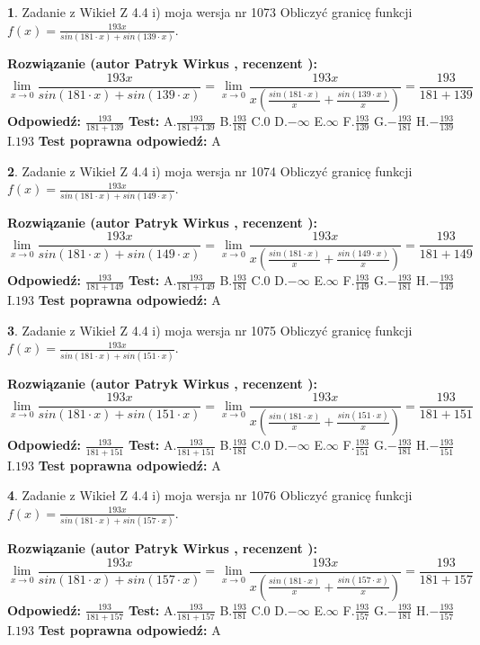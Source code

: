 \documentclass[12pt, a4paper]{article}
\theoremstyle{definition} %
\newtheorem{zad}{}
\newcommand{\zadStart}[1]{\begin{zad}#1\newline}
\newcommand{\zadStop}{\end{zad}}
\newcommand{\rozwStart}[2]{\noindent \textbf{Rozwiązanie (autor #1 , recenzent #2): }\newline}
\newcommand{\rozwStop}{\newline}
\newcommand{\odpStart}{\noindent \textbf{Odpowiedź:}\newline}
\newcommand{\odpStop}{\newline}
\newcommand{\testStart}{\noindent \textbf{Test:}\newline}
\newcommand{\testStop}{\newline}
\newcommand{\kluczStart}{\noindent \textbf{Test poprawna odpowiedź:}\newline}
\newcommand{\kluczStop}{\newline}
\begin{document}
\zadStart{Zadanie z Wikieł Z 4.4 i) moja wersja nr 1073}
Obliczyć granicę funkcji $f(x)=\frac{193x}{sin(181\cdot x) +sin(139\cdot x)}$.
\zadStop
\rozwStart{Patryk Wirkus}{}
$$\lim\limits_{x\to 0}\frac{193x}{sin(181\cdot x) +sin(139\cdot x)}=\lim\limits_{x\to 0}\frac{193x}{x(\frac{sin(181\cdot x)}{x}+\frac{sin(139\cdot x)}{x})}=\frac{193}{181+139}$$
\rozwStop
\odpStart
$\frac{193}{181+139}$
\odpStop
\testStart
A.$\frac{193}{181+139}$
B.$\frac{193}{181}$
C.$0$
D.$-\infty$
E.$\infty$
F.$\frac{193}{139}$
G.$-\frac{193}{181}$
H.$-\frac{193}{139}$
I.$193$
\testStop
\kluczStart
A
\kluczStop



\zadStart{Zadanie z Wikieł Z 4.4 i) moja wersja nr 1074}
Obliczyć granicę funkcji $f(x)=\frac{193x}{sin(181\cdot x) +sin(149\cdot x)}$.
\zadStop
\rozwStart{Patryk Wirkus}{}
$$\lim\limits_{x\to 0}\frac{193x}{sin(181\cdot x) +sin(149\cdot x)}=\lim\limits_{x\to 0}\frac{193x}{x(\frac{sin(181\cdot x)}{x}+\frac{sin(149\cdot x)}{x})}=\frac{193}{181+149}$$
\rozwStop
\odpStart
$\frac{193}{181+149}$
\odpStop
\testStart
A.$\frac{193}{181+149}$
B.$\frac{193}{181}$
C.$0$
D.$-\infty$
E.$\infty$
F.$\frac{193}{149}$
G.$-\frac{193}{181}$
H.$-\frac{193}{149}$
I.$193$
\testStop
\kluczStart
A
\kluczStop



\zadStart{Zadanie z Wikieł Z 4.4 i) moja wersja nr 1075}
Obliczyć granicę funkcji $f(x)=\frac{193x}{sin(181\cdot x) +sin(151\cdot x)}$.
\zadStop
\rozwStart{Patryk Wirkus}{}
$$\lim\limits_{x\to 0}\frac{193x}{sin(181\cdot x) +sin(151\cdot x)}=\lim\limits_{x\to 0}\frac{193x}{x(\frac{sin(181\cdot x)}{x}+\frac{sin(151\cdot x)}{x})}=\frac{193}{181+151}$$
\rozwStop
\odpStart
$\frac{193}{181+151}$
\odpStop
\testStart
A.$\frac{193}{181+151}$
B.$\frac{193}{181}$
C.$0$
D.$-\infty$
E.$\infty$
F.$\frac{193}{151}$
G.$-\frac{193}{181}$
H.$-\frac{193}{151}$
I.$193$
\testStop
\kluczStart
A
\kluczStop



\zadStart{Zadanie z Wikieł Z 4.4 i) moja wersja nr 1076}
Obliczyć granicę funkcji $f(x)=\frac{193x}{sin(181\cdot x) +sin(157\cdot x)}$.
\zadStop
\rozwStart{Patryk Wirkus}{}
$$\lim\limits_{x\to 0}\frac{193x}{sin(181\cdot x) +sin(157\cdot x)}=\lim\limits_{x\to 0}\frac{193x}{x(\frac{sin(181\cdot x)}{x}+\frac{sin(157\cdot x)}{x})}=\frac{193}{181+157}$$
\rozwStop
\odpStart
$\frac{193}{181+157}$
\odpStop
\testStart
A.$\frac{193}{181+157}$
B.$\frac{193}{181}$
C.$0$
D.$-\infty$
E.$\infty$
F.$\frac{193}{157}$
G.$-\frac{193}{181}$
H.$-\frac{193}{157}$
I.$193$
\testStop
\kluczStart
A
\kluczStop
\end{document}

